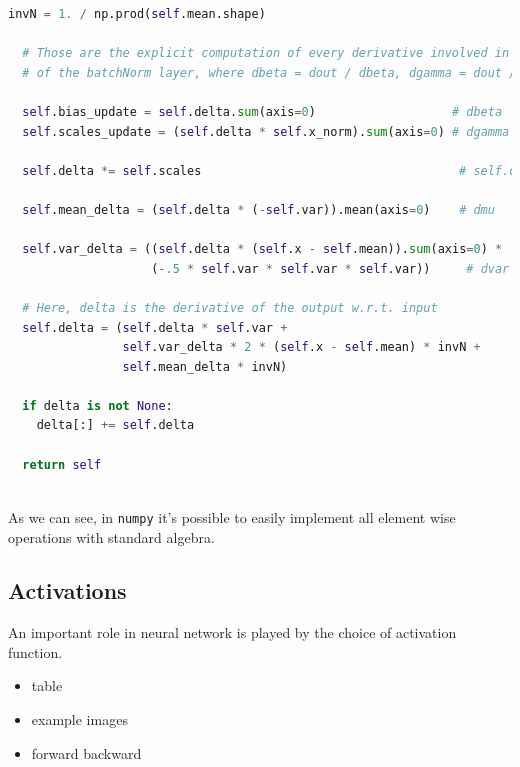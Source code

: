 \documentclass[12pt,a4paper]{report}
\begin{document}
\begin{lstlisting}[language=Python, caption=NumPyNet version of batchnorm function, label=code:py_batchnorm]
  invN = 1. / np.prod(self.mean.shape)

  # Those are the explicit computation of every derivative involved in BackPropagation
  # of the batchNorm layer, where dbeta = dout / dbeta, dgamma = dout / dgamma etc...

  self.bias_update = self.delta.sum(axis=0)                   # dbeta
  self.scales_update = (self.delta * self.x_norm).sum(axis=0) # dgamma

  self.delta *= self.scales                                    # self.delta = dx_norm from now on

  self.mean_delta = (self.delta * (-self.var)).mean(axis=0)    # dmu

  self.var_delta = ((self.delta * (self.x - self.mean)).sum(axis=0) *
                    (-.5 * self.var * self.var * self.var))     # dvar

  # Here, delta is the derivative of the output w.r.t. input
  self.delta = (self.delta * self.var +
                self.var_delta * 2 * (self.x - self.mean) * invN +
                self.mean_delta * invN)

  if delta is not None:
    delta[:] += self.delta

  return self
  
\end{lstlisting}

As we can see, in \texttt{numpy} it's possible to easily implement all element wise operations with standard algebra.

\subsection*{Activations}

An important role in neural network is played by the choice of activation function.

\begin{itemize}
 \item table
 \item example images
 \item forward backward
\end{itemize}
\end{document}
